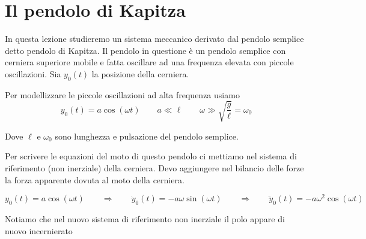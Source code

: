 \chapter{Il pendolo di Kapitza}

In questa lezione studieremo un sistema meccanico derivato dal pendolo semplice detto pendolo di Kapitza. Il pendolo in questione è un pendolo semplice con cerniera superiore mobile e fatta oscillare ad una frequenza elevata con piccole oscillazioni. Sia $y_0(t)$ la posizione della cerniera.

\begin{center}
\end{center}

Per modellizzare le piccole oscillazioni ad alta frequenza usiamo
\[
y_0(t)=a\cos(\omega t)
\qquad
a\ll \ell
\qquad
\omega \gg \sqrt{\frac{g}{\ell}}=\omega_0
\]

Dove $\ell$ e $\omega_0$ sono lunghezza e pulsazione del pendolo semplice.

Per scrivere le equazioni del moto di questo pendolo ci mettiamo nel sistema di riferimento (non inerziale) della cerniera. Devo aggiungere nel bilancio delle forze la forza apparente dovuta al moto della cerniera.

\[
y_0(t)=a\cos(\omega t)
\qquad \Rightarrow \qquad
\dot{y}_0(t)=-a\omega\sin(\omega t)
\qquad \Rightarrow \qquad
\ddot{y}_0(t)=-a\omega^2\cos(\omega t)
\]

Notiamo che nel nuovo sistema di riferimento non inerziale il polo appare di nuovo incernierato

